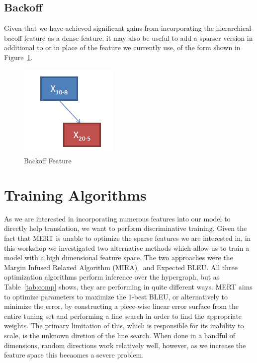 \subsection{Backoff}
Given that we have achieved significant gains from incorporating the hierarchical-bacoff feature as a dense feature, it may also be useful to add a sparser version in additional to or in place of the feature we currently use, of the form shown in Figure~\ref{fig:back_feat}.


\begin{figure}[h]
	\centering
		\includegraphics[scale=0.5]{training_img_files/back_feat.PNG}
	\caption{Backoff Feature}
	\label{fig:back_feat}
\end{figure}

\section{Training Algorithms}

As we are interested in incorporating numerous features into our model to directly help translation, we want to perform discriminative training. Given the fact that MERT is unable to optimize the sparse features we are interested in, in this workshop we investigated two alternative methods which allow us to train a model with a high dimensional feature space. The two approaches were the Margin Infused Relaxed Algorithm (MIRA)~\cite{mira:05} and Expected BLEU. All three optimization algorithms perform inference over the hypergraph, but as Table~\ref{tab:comp} shows, they are performing in quite different ways. MERT aims to optimize parameters to maximize the 1-best BLEU, or alternatively to minimize the error, by constructing a piece-wise linear error surface from the entire tuning set and performing a line search in order to find the appropriate weights. The primary limitation of this, which is responsible for its inability to scale, is the unknown diretion of the line search. When done in a handful of dimensions, random directions work relatively well, however, as we increase the feature space this becaomes a severe problem. 

